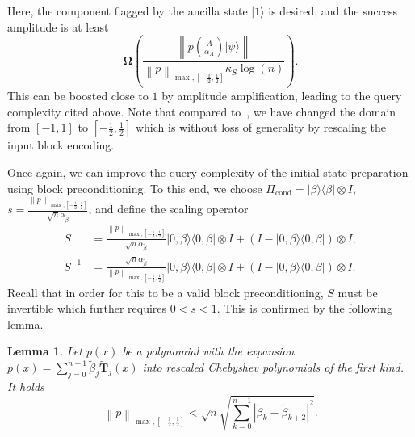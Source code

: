 \documentclass[letterpaper,onecolumn,11pt,accepted=2026-02-14]{quantumarticle}
\newcommand{\norm}[1]{\left\lVert#1\right\rVert}
\newtheorem{lemma}{Lemma}
\theoremstyle{remark}
\theoremstyle{plain}
\newcommand{\ket}[1]{|#1\rangle}
\newcommand{\bra}[1]{\langle#1|}
\newcommand{\ketbra}[2]{\ket{#1}\!\bra{#2}}
\begin{document}
Here, the component flagged by the ancilla state $\ket{1}$ is desired, and the success amplitude is at least
\begin{equation}
    \mathbf{\Omega}\left(\frac{\norm{p\left(\frac{A}{\alpha_A}\right)\ket{\psi}}}{\norm{p}_{\max,\left[-\frac{1}{2},\frac{1}{2}\right]}\kappa_S\log(n)}\right).
\end{equation}
This can be boosted close to $1$ by amplitude amplification, leading to the query complexity cited above.
Note that compared to~\cite{QEVP}, we have changed the domain from $[-1,1]$ to $\left[-\frac{1}{2},\frac{1}{2}\right]$ which is without loss of generality by rescaling the input block encoding.

Once again, we can improve the query complexity of the initial state preparation using block preconditioning. To this end, we choose $\Pi_{\text{cond}}=\ketbra{\beta}{\beta}\otimes I$, $s=\frac{\norm{p}_{\max,[-\frac{1}{2},\frac{1}{2}]}}{\sqrt{n}\alpha_{\widetilde{\beta}}}$, and define the scaling operator
\begin{equation}
\begin{aligned}
    S&=\frac{\norm{p}_{\max,\left[-\frac{1}{2},\frac{1}{2}\right]}}{\sqrt{n}\alpha_{\widetilde{\beta}}}\ketbra{0,\beta}{0,\beta}\otimes I+\left(I-\ketbra{0,\beta}{0,\beta}\right)\otimes I,\\
    S^{-1}&=\frac{\sqrt{n}\alpha_{\widetilde{\beta}}}{\norm{p}_{\max,\left[-\frac{1}{2},\frac{1}{2}\right]}}\ketbra{0,\beta}{0,\beta}\otimes I+\left(I-\ketbra{0,\beta}{0,\beta}\right)\otimes I.
\end{aligned}
\end{equation}
Recall that in order for this to be a valid block preconditioning, $S$ must be invertible which further requires $0<s<1$. 
This is confirmed by the following lemma.
\begin{lemma}
Let $p(x)$ be a polynomial with the expansion $p(x)=\sum_{j=0}^{n-1}\widetilde{\beta}_j\widetilde{\mathbf{T}}_j(x)$ into rescaled Chebyshev polynomials of the first kind. It holds
\begin{equation}
    \norm{p}_{\max,\left[-\frac{1}{2},\frac{1}{2}\right]}<\sqrt{n}\sqrt{\sum_{k=0}^{n-1}|\widetilde{\beta}_k-\widetilde{\beta}_{k+2}|^2}.
\end{equation}
\end{lemma}
\end{document}
